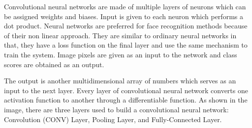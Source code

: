 \documentclass[conference]{IEEEtran}
\begin{document}
Convolutional neural networks are made of multiple layers of neurons which can be assigned weights and biases. Input is given to each neuron which performs a dot product. Neural networks are preferred for face recognition methods because of their non linear approach. They are similar to ordinary neural networks in that, they have a loss function on the final layer and use the same mechanism to train the system. Image pixels are given as an input to the network and class scores are obtained as an output. 


 The output is another multidimensional array of numbers which serves as an input to the next layer. Every layer of convolutional neural network converts one activation function to another through a differentiable function. As shown in the image, there are three layers used to build a convolutional neural network: Convolution (CONV) Layer, Pooling Layer, and Fully-Connected Layer. 
 
\end{document}
